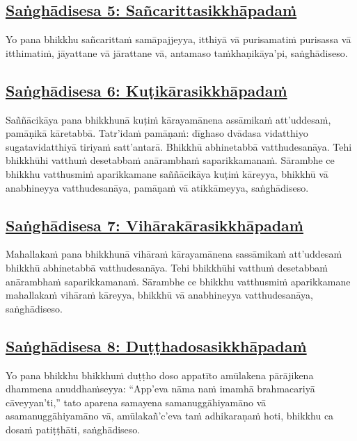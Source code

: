 \subsection*{\hyperref[comm5]{Saṅghādisesa 5: Sañcarittasikkhāpadaṁ}}
\label{sd5}

Yo pana bhikkhu sañcarittaṁ samāpajjeyya, itthiyā vā purisamatiṁ purisassa vā itthimatiṁ, jāyattane vā jārattane vā, antamaso taṁkhaṇikāya'pi, saṅghādiseso.



\subsection*{\hyperref[comm6]{Saṅghādisesa 6: Kuṭikārasikkhāpadaṁ}}
\label{sd6}

Saññācikāya pana bhikkhunā kuṭiṁ kārayamānena assāmikaṁ att'uddesaṁ, pamāṇikā kāretabbā. Tatr'idaṁ pamāṇaṁ: dīghaso dvādasa vidatthiyo sugatavidatthiyā tiriyaṁ satt'antarā. Bhikkhū abhinetabbā vatthudesanāya. Tehi bhikkhūhi vatthuṁ desetabbaṁ anārambhaṁ saparikkamanaṁ. Sārambhe ce bhikkhu vatthusmiṁ aparikkamane saññācikāya kuṭiṁ kāreyya, bhikkhū vā anabhineyya vatthudesanāya, pamāṇaṁ vā atikkāmeyya, saṅghādiseso.



\subsection*{\hyperref[comm7]{Saṅghādisesa 7: Vihārakārasikkhāpadaṁ}}
\label{sd7}

Mahallakaṁ pana bhikkhunā vihāraṁ kārayamānena sassāmikaṁ att'uddesaṁ bhikkhū abhinetabbā vatthudesanāya. Tehi bhikkhūhi vatthuṁ desetabbaṁ anārambhaṁ saparikkamanaṁ. Sārambhe ce bhikkhu vatthusmiṁ aparikkamane mahallakaṁ vihāraṁ kāreyya, bhikkhū vā anabhineyya vatthudesanāya, saṅghādiseso.



\subsection*{\hyperref[comm8]{Saṅghādisesa 8: Duṭṭhadosasikkhāpadaṁ}}
\label{sd8}

Yo pana bhikkhu bhikkhuṁ duṭṭho doso appatīto amūlakena pārājikena dhammena anuddhaṁseyya: ``App'eva nāma naṁ imamhā brahmacariyā cāveyyan'ti,'' tato aparena samayena samanuggāhiyamāno vā asamanuggāhiyamāno vā, amūlakañ'c'eva taṁ adhikaraṇaṁ hoti, bhikkhu ca dosaṁ patiṭṭhāti, saṅghādiseso.



